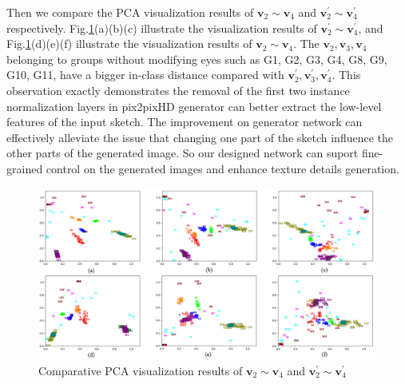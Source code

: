 \documentclass[10pt,twocolumn,letterpaper]{article}
\begin{document}

Then we compare the PCA visualization results of $\boldsymbol{v}_2\sim\boldsymbol{v}_4$ and $\boldsymbol{v}_2^{'}\sim\boldsymbol{v}_4^{'}$ respectively. 
Fig.\ref{fig:pca_4}(a)(b)(c) illustrate the visualization results of $\boldsymbol{v}_2^{'}\sim\boldsymbol{v}_4^{'}$, and Fig.\ref{fig:pca_4}(d)(e)(f) illustrate the visualization results of $\boldsymbol{v}_2\sim\boldsymbol{v}_4$. 
The $\boldsymbol{v}_2, \boldsymbol{v}_3, \boldsymbol{v}_4$ belonging to groups without modifying eyes such as G1, G2, G3, G4, G8, G9, G10, G11, have a bigger in-class distance compared with $\boldsymbol{v}_2^{'}, \boldsymbol{v}_3^{'}, \boldsymbol{v}_4^{'}$. 
This observation exactly demonstrates the removal of the first two instance normalization layers in pix2pixHD generator can better extract the low-level features of the input sketch. 
The improvement on generator network can effectively alleviate the issue that changing one part of the sketch influence the other parts of the generated image. So our designed network can suport fine-grained control on the generated images and enhance texture details generation.
\begin{figure}[htb]
	\centering
	\includegraphics[width=0.8 \textwidth]{pca_4.png}
	\caption{Comparative PCA visualization results of $\boldsymbol{v}_2\sim\boldsymbol{v}_4$ and $\boldsymbol{v}_2^{'}\sim\boldsymbol{v}_4^{'}$}
	\label{fig:pca_4}
\end{figure}
\end{document}
